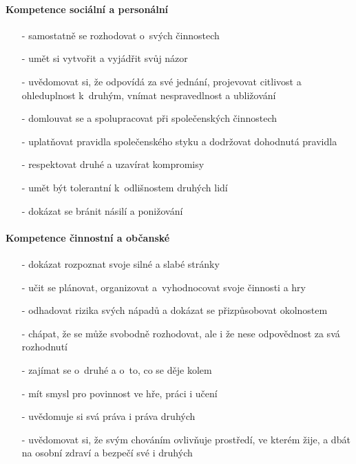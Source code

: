 				\paragraph{Kompetence sociální a personální}
				\begin{itemize}
				\setlength\itemsep{-2mm}
				\item[-] samostatně se rozhodovat o~svých činnostech
				\item[-] umět si vytvořit a vyjádřit svůj názor
				\item[-] uvědomovat si, že odpovídá za své jednání, projevovat citlivost a ohleduplnost k druhým, vnímat nespravedlnost a ubližování
				\item[-] domlouvat se a spolupracovat při společenských činnostech
				\item[-] uplatňovat pravidla společenského styku a dodržovat dohodnutá pravidla 
				\item[-] respektovat druhé a uzavírat kompromisy 
				\item[-] umět být tolerantní k odlišnostem druhých lidí
				\item[-] dokázat se bránit násilí a ponižování
				\end{itemize}

				\paragraph{Kompetence činnostní a občanské}
				\begin{itemize}
				\setlength\itemsep{-2mm}
				\item[-] dokázat rozpoznat svoje silné a slabé stránky
				\item[-] učit se plánovat, organizovat a vyhodnocovat svoje činnosti a hry
				\item[-] odhadovat rizika svých nápadů a dokázat se přizpůsobovat okolnostem
				\item[-] chápat, že se může svobodně rozhodovat, ale i že nese odpovědnost za svá rozhodnutí
				\item[-] zajímat se o~druhé a o~to, co se děje kolem
				\item[-] mít smysl pro povinnost ve hře, práci i učení
				\item[-] uvědomuje si svá práva i práva druhých
				\item[-] uvědomovat si, že svým chováním ovlivňuje prostředí, ve kterém žije, a dbát na osobní zdraví a bezpečí své i druhých
				\end{itemize}



